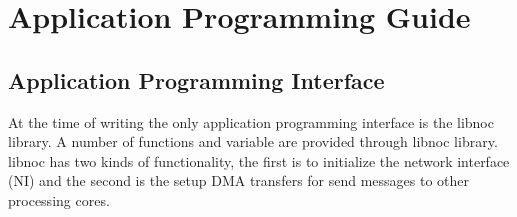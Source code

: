 \documentclass[a4paper,fontsize=10pt,twoside,DIV15,BCOR12mm,headinclude=true,footinclude=false,pagesize,bibtotoc]{scrbook}
\newcommand{\code}[1]{{\texttt{#1}}}
\newcommand{\comment}[3]{

\textsf{\textbf{#1}} {\color{#3}#2}}
\newcommand{\martin}[1]{\comment{Martin}{#1}{Blue}}
\begin{document}
%
%
%
%
%
%
%
%


\chapter{Application Programming Guide}

\section{Application Programming Interface}
\label{sec:api}

At the time of writing the only application programming interface is the libnoc library. A number of functions and variable are provided through libnoc library. libnoc has two kinds of functionality, the first is to initialize the network interface (NI) and the second is the setup DMA transfers for send messages to other processing cores. 
\end{document}
